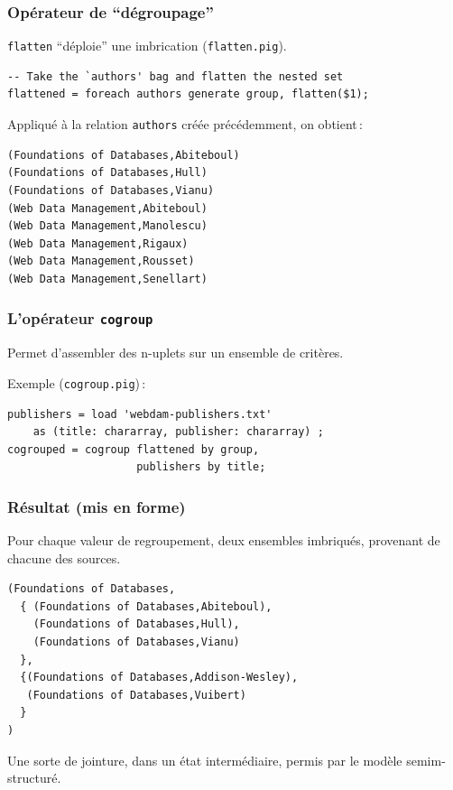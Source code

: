 \begin{frame}[fragile]
\frametitle{Opérateur de ``dégroupage''}

\texttt{flatten} ``déploie'' une imbrication (\texttt{flatten.pig}).

\begin{verbatim}
-- Take the `authors' bag and flatten the nested set
flattened = foreach authors generate group, flatten($1);
\end{verbatim}

\vfill

Appliqué à la relation  \texttt{authors} créée précédemment, on obtient\,:


\small\begin{verbatim}
(Foundations of Databases,Abiteboul)
(Foundations of Databases,Hull)
(Foundations of Databases,Vianu)
(Web Data Management,Abiteboul)
(Web Data Management,Manolescu)
(Web Data Management,Rigaux)
(Web Data Management,Rousset)
(Web Data Management,Senellart)
\end{verbatim}
\end{frame}


\begin{frame}[fragile]
\frametitle{L'opérateur \texttt{cogroup}}

\vfill
Permet d'assembler des n-uplets sur un ensemble de critères.


\vfill
Exemple (\texttt{cogroup.pig})\,:

\begin{verbatim}
publishers = load 'webdam-publishers.txt' 
    as (title: chararray, publisher: chararray) ;
cogrouped = cogroup flattened by group,
                    publishers by title;
\end{verbatim}

\end{frame}


\begin{frame}[fragile]
\frametitle{Résultat (mis en forme)}
\vfill
Pour chaque valeur de regroupement, deux ensembles imbriqués,
provenant de chacune des sources.

\vfill

{\small\begin{verbatim}
(Foundations of Databases,
  { (Foundations of Databases,Abiteboul),
    (Foundations of Databases,Hull),
    (Foundations of Databases,Vianu)
  },
  {(Foundations of Databases,Addison-Wesley),
   (Foundations of Databases,Vuibert)
  }
)
\end{verbatim}
}

\vfill
Une sorte de jointure, dans un état intermédiaire, permis par le modèle semim-structuré.

\end{frame}


